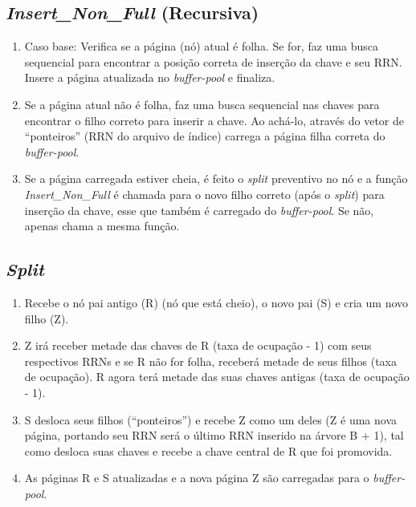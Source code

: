 \documentclass[
	12pt,				%
	openany,			%
	twoside,			%
	a4paper,			%
	english,			%
	french,				%
	spanish,			%
	brazil,				%
	]{abntex2}
\begin{document}
    \subsection{\textit{Insert\_Non\_Full} (Recursiva)}
    
        \begin{enumerate}
            \item Caso base: Verifica se a página (nó) atual é folha. Se for, faz uma busca sequencial para encontrar a posição correta de inserção da chave e seu RRN. Insere a página atualizada no \textit{buffer-pool} e finaliza.
            \item Se a página atual não é folha, faz uma busca sequencial nas chaves para encontrar o filho correto para inserir a chave. Ao achá-lo, através do vetor de “ponteiros” (RRN do arquivo de índice) carrega a página filha correta do \textit{buffer-pool}.
            \item Se a página carregada estiver cheia, é feito o \textit{split} preventivo no nó e a função \textit{Insert\_Non\_Full} é chamada para o novo filho correto (após o \textit{split}) para inserção da chave, esse que também é carregado do \textit{buffer-pool}. Se não, apenas chama a mesma função.
        \end{enumerate}
    
    \subsection{\textit{Split}}
        
        \begin{enumerate}
            \item Recebe o nó pai antigo (R) (nó que está cheio), o novo pai (S) e cria um novo filho (Z).
            \item Z irá receber metade das chaves de R (taxa de ocupação - 1) com seus respectivos RRNs e se R não for folha, receberá metade de seus filhos (taxa de ocupação). R agora terá metade das suas chaves antigas (taxa de ocupação - 1).
            \item S desloca seus filhos (“ponteiros”) e recebe Z como um deles (Z é uma nova página, portando seu RRN será o último RRN inserido na árvore B + 1), tal como desloca suas chaves e recebe a chave central de R que foi promovida.
            \item As páginas R e S atualizadas e a nova página Z são carregadas para o \textit{buffer-pool}.
        \end{enumerate}
        
\end{document}
